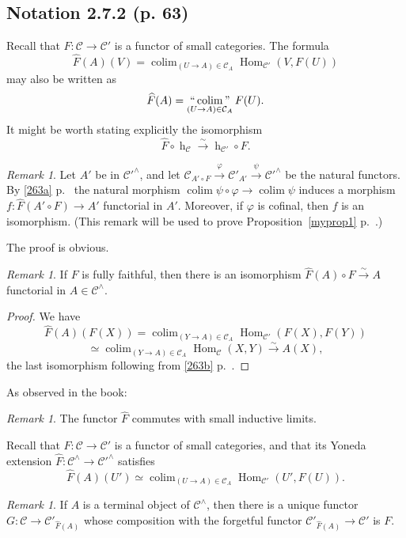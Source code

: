 \documentclass[12pt]{article}%
\theoremstyle{remark}
\newtheorem{rk}[thm]{Remark}
\theoremstyle{definition}
\newcommand{\cc}{\mathcal}
\newcommand{\C}{\mathcal C}
\newcommand{\pp}{\varphi}
\newcommand{\xr}{\xrightarrow}
\DeclareMathOperator*{\colim}{colim}%
\DeclareMathOperator*{\col}{colim}
\DeclareMathOperator*{\icolim}{``\colim"}
\DeclareMathOperator{\hy}{h}
\DeclareMathOperator{\Hom}{Hom}%
\begin{document}

\subsection{Notation 2.7.2 (p. 63)}

Recall that $F:\C\to\C'$ is a functor of small categories. The formula 
$$
\widehat F(A)(V)=\colim_{(U\to A)\in\C_A}\Hom_{\C'}(V,F(U))
$$
may also be written as 
$$
\widehat F(A)=\icolim_{(U\to A)\in\C_A}F(U).
$$
It might be worth stating explicitly the isomorphism 
$$
\widehat F\circ\hy_\C\xr\sim\hy_{\C'}\circ F.
$$

\begin{rk}\label{cof}
Let $A'$ be in $\cc C'^\wedge$, and let $\cc C_{A'\circ F}\xr\pp\cc C'_{A'}\xr\psi\C'^\wedge$ be the natural functors. By \eqref{263a} p.~\pageref{263a} the natural morphism $\colim\psi\circ\pp\to\colim\psi$ induces a morphism $f:\widehat F(A'\circ F)\to A'$ functorial in $A'$. Moreover, if $\pp$ is cofinal, then $f$ is an isomorphism. (This remark will be used to prove Proposition~\ref{myprop1} p.~\pageref{myprop1}.)
\end{rk}

The proof is obvious.

\begin{rk}
If $F$ is fully faithful, then there is an isomorphism $\widehat F(A)\circ F\xr\sim A$ functorial in $A\in\C^\wedge$.
\end{rk} 

\begin{proof}
We have 
$$
\widehat F(A)(F(X))=\colim_{(Y\to A)\in\C_A}\Hom_{\C'}(F(X),F(Y))
$$
$$
\simeq\colim_{(Y\to A)\in\C_A}\Hom_\C(X,Y)\xr\sim A(X),
$$
the last isomorphism following from \eqref{263b} p.~\pageref{263b}.
\end{proof}

As observed in the book:

\begin{rk}\label{272}
The functor $\widehat F$ commutes with small inductive limits.
\end{rk}

Recall that $F:\C\to\C'$ is a functor of small categories, and that its Yoneda extension $\widehat F:\C^\wedge\to\C'^\wedge$ satisfies 
$$
\widehat F(A)(U')\simeq\col_{(U\to A)\in\C_A}\Hom_{\C'}(U',F(U)).
$$ 

\begin{rk}\label{272b}
If $A$ is a terminal object of $\C^\wedge$, then there is a unique functor $G:\C\to\C'_{\widehat F(A)}$ whose composition with the forgetful functor $\C'_{\widehat F(A)}\to\C'$ is $F$.
\end{rk}
\end{document}
